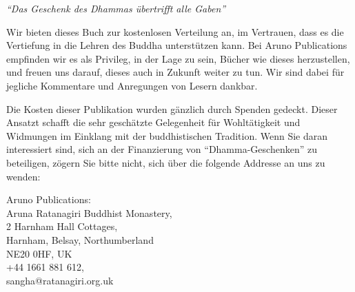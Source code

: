 {\smaller\centering

\emph{“Das Geschenk des Dhammas übertrifft alle Gaben”}\\[0.2\baselineskip]

Wir bieten dieses Buch zur kostenlosen Verteilung an, im Vertrauen, dass es die
Vertiefung in die Lehren des Buddha unterstützen kann. Bei Aruno Publications
empfinden wir es als Privileg, in der Lage zu sein, Bücher wie dieses
herzustellen, und freuen uns darauf, dieses auch in Zukunft weiter zu tun. Wir
sind dabei für jegliche Kommentare und Anregungen von Lesern dankbar.

Die Kosten dieser Publikation wurden gänzlich durch Spenden gedeckt. Dieser
Ansatzt schafft die sehr geschätzte Gelegenheit für Wohltätigkeit und Widmungen
im Einklang mit der buddhistischen Tradition. Wenn Sie daran interessiert sind,
sich an der Finanzierung von “Dhamma-Geschenken” zu beteiligen, zögern Sie bitte
nicht, sich über die folgende Addresse an uns zu wenden:

Aruno Publications:\\
Aruna Ratanagiri Buddhist Monastery,\\
2 Harnham Hall Cottages,\\
Harnham, Belsay, Northumberland\\
NE20 0HF, UK\\
+44 1661 881 612,\\
sangha@ratanagiri.org.uk

}


